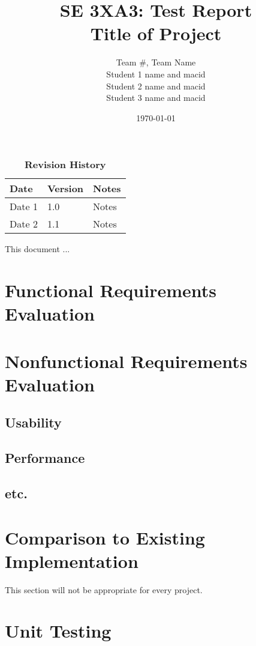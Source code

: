 \documentclass[12pt, titlepage]{article}
\title{SE 3XA3: Test Report\\Title of Project}
\author{Team \#, Team Name
		\\ Student 1 name and macid
		\\ Student 2 name and macid
		\\ Student 3 name and macid
}
\date{\today}
\begin{document}
\maketitle

\tableofcontents
\listoftables
\listoffigures

\begin{table}[bp]
\caption{\bf Revision History}
\begin{tabularx}{\textwidth}{p{3cm}p{2cm}X}
\toprule {\bf Date} & {\bf Version} & {\bf Notes}\\
\midrule
Date 1 & 1.0 & Notes\\
Date 2 & 1.1 & Notes\\
\bottomrule
\end{tabularx}
\end{table}

\newpage


This document ...

\section{Functional Requirements Evaluation}

\section{Nonfunctional Requirements Evaluation}

\subsection{Usability}
		
\subsection{Performance}

\subsection{etc.}
	
\section{Comparison to Existing Implementation}	

This section will not be appropriate for every project.

\section{Unit Testing}
\end{document}
